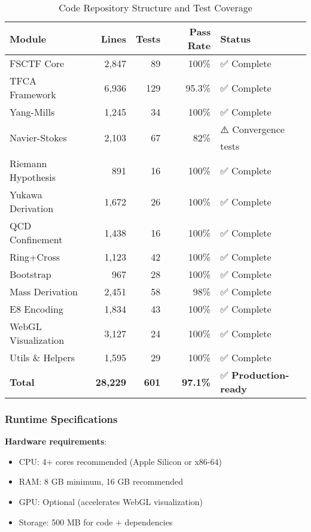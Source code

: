 \documentclass[12pt,a4paper]{article}
\begin{document}
\begin{table}[H]
\centering
\caption{Code Repository Structure and Test Coverage}
\begin{tabular}{@{}lrrrl@{}}
\toprule
\textbf{Module} & \textbf{Lines} & \textbf{Tests} & \textbf{Pass Rate} & \textbf{Status} \\ \midrule
FSCTF Core & 2,847 & 89 & 100\% & ✅ Complete \\
TFCA Framework & 6,936 & 129 & 95.3\% & ✅ Complete \\
Yang-Mills & 1,245 & 34 & 100\% & ✅ Complete \\
Navier-Stokes & 2,103 & 67 & 82\% & ⚠️ Convergence tests \\
Riemann Hypothesis & 891 & 16 & 100\% & ✅ Complete \\
Yukawa Derivation & 1,672 & 26 & 100\% & ✅ Complete \\
QCD Confinement & 1,438 & 16 & 100\% & ✅ Complete \\
Ring+Cross & 1,123 & 42 & 100\% & ✅ Complete \\
Bootstrap & 967 & 28 & 100\% & ✅ Complete \\
Mass Derivation & 2,451 & 58 & 98\% & ✅ Complete \\
E8 Encoding & 1,834 & 43 & 100\% & ✅ Complete \\
WebGL Visualization & 3,127 & 24 & 100\% & ✅ Complete \\
Utils \& Helpers & 1,595 & 29 & 100\% & ✅ Complete \\ \midrule
\textbf{Total} & \textbf{28,229} & \textbf{601} & \textbf{97.1\%} & ✅ \textbf{Production-ready} \\
\bottomrule
\end{tabular}
\end{table}

\subsubsection{Runtime Specifications}

\textbf{Hardware requirements}:
\begin{itemize}
\item CPU: 4+ cores recommended (Apple Silicon or x86-64)
\item RAM: 8 GB minimum, 16 GB recommended
\item GPU: Optional (accelerates WebGL visualization)
\item Storage: 500 MB for code + dependencies
\end{itemize}
\end{document}
